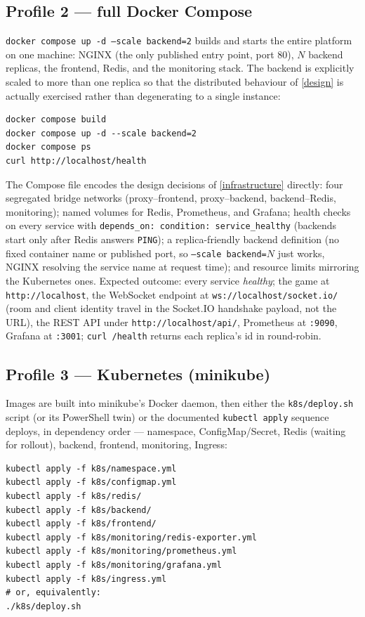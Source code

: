 \documentclass{scrartcl}
\begin{document}
\subsection{Profile 2 --- full Docker Compose}\label{profile-compose}

\texttt{docker compose up -d --scale backend=2} builds and starts the entire
platform on one machine: NGINX (the only published entry point, port 80), $N$
backend replicas, the frontend, Redis, and the monitoring stack. The backend is
explicitly scaled to more than one replica so that the distributed behaviour of
\cref{design} is actually exercised rather than degenerating to a single instance:

\begin{verbatim}
docker compose build
docker compose up -d --scale backend=2
docker compose ps
curl http://localhost/health
\end{verbatim}

The Compose file encodes the design decisions of \cref{infrastructure} directly:
four segregated bridge networks (proxy--frontend, proxy--backend, backend--Redis,
monitoring); named volumes for Redis, Prometheus, and Grafana; health checks on
every service with \texttt{depends\_on: condition: service\_healthy} (backends
start only after Redis answers \texttt{PING}); a replica-friendly backend
definition (no fixed container name or published port, so \texttt{--scale
      backend=$N$} just works, NGINX resolving the service name at request time); and
resource limits mirroring the Kubernetes ones. Expected outcome: every service
\emph{healthy}; the game at \texttt{http://localhost}, the WebSocket endpoint at
\texttt{ws://localhost/socket.io/} (room and client identity travel in the
Socket.IO handshake payload, not the URL), the REST API under
\texttt{http://localhost/api/}, Prometheus at \texttt{:9090}, Grafana at
\texttt{:3001}; \texttt{curl /health} returns each replica's id in round-robin.
\subsection{Profile 3 --- Kubernetes (minikube)}\label{profile-k8s}

Images are built into minikube's Docker daemon, then either the
\texttt{k8s/deploy.sh} script (or its PowerShell twin) or the documented
\texttt{kubectl apply} sequence deploys, in dependency order --- namespace,
ConfigMap/Secret, Redis (waiting for rollout), backend, frontend, monitoring,
Ingress:

\begin{verbatim}
kubectl apply -f k8s/namespace.yml
kubectl apply -f k8s/configmap.yml
kubectl apply -f k8s/redis/
kubectl apply -f k8s/backend/
kubectl apply -f k8s/frontend/
kubectl apply -f k8s/monitoring/redis-exporter.yml
kubectl apply -f k8s/monitoring/prometheus.yml
kubectl apply -f k8s/monitoring/grafana.yml
kubectl apply -f k8s/ingress.yml
# or, equivalently:
./k8s/deploy.sh
\end{verbatim}
\end{document}
